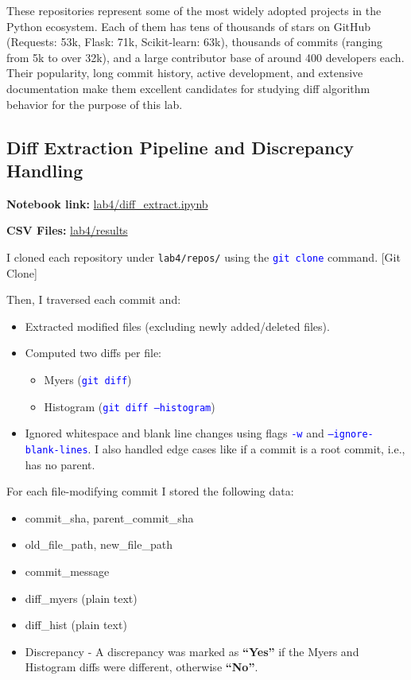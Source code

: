 \documentclass[10pt,a4paper]{report}
\newcommand{\command}[1]{\texttt{\textcolor{blue}{#1}}}
\begin{document}
These repositories represent some of the most widely adopted projects in the Python ecosystem. Each of them has tens of thousands of stars on GitHub (Requests: 53k, Flask: 71k, Scikit-learn: 63k), thousands of commits (ranging from 5k to over 32k), and a large contributor base of around 400 developers each. Their popularity, long commit history, active development, and extensive documentation make them excellent candidates for studying diff algorithm behavior for the purpose of this lab.


\subsection{Diff Extraction Pipeline and Discrepancy Handling}

\textbf{Notebook link:} \href{https://github.com/ShardulJunagade/cs202-stt/blob/main/lab4/diff_extract.ipynb}{lab4/diff\_extract.ipynb}

\textbf{CSV Files:} \href{https://iitgnacin-my.sharepoint.com/:f:/g/personal/23110297_iitgn_ac_in/EoSVKnmVOgBFgk962nYvEUsBtuecB5xT6tOSazlldOD6YA?e=UOsFIl}{lab4/results}

I cloned each repository under \texttt{lab4/repos/} using the \command{git clone} command.
[Git Clone]

Then, I traversed each commit and:
\begin{itemize}[itemsep=0em, topsep=0pt]
    \item Extracted modified files (excluding newly added/deleted files).  
    \item Computed two diffs per file:
    \begin{itemize}[itemsep=0em, topsep=0pt]
        \item Myers (\command{git diff})  
        \item Histogram (\command{git diff --histogram})  
    \end{itemize}
    \item Ignored whitespace and blank line changes using flags \command{-w} and \command{--ignore-blank-lines}. I also handled edge cases like if a commit is a root commit, i.e., has no parent.
\end{itemize}

For each file-modifying commit I stored the following data:
\begin{itemize}[itemsep=0em, topsep=0pt]
    \item commit\_sha, parent\_commit\_sha
    \item old\_file\_path, new\_file\_path
    \item commit\_message
    \item diff\_myers (plain text) 
    \item diff\_hist (plain text)
    \item Discrepancy - A discrepancy was marked as \textbf{``Yes''} if the Myers and Histogram diffs were different, otherwise \textbf{``No''}.  
\end{itemize}
\end{document}
